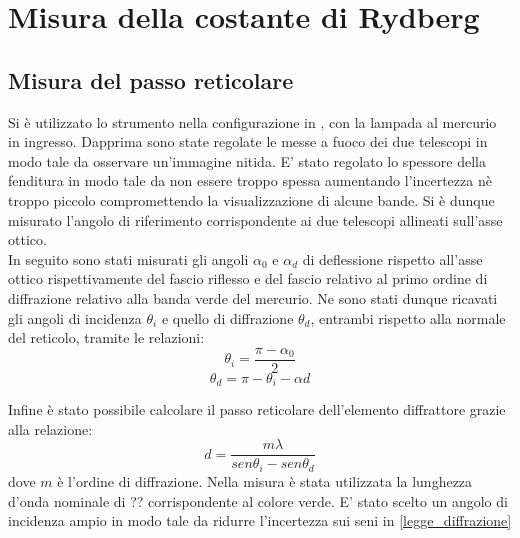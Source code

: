 \section{Misura della costante di Rydberg}

\subsection{Misura del passo reticolare}
Si è utilizzato lo strumento nella configurazione in , con la lampada al mercurio in ingresso. Dapprima sono state regolate le messe a fuoco dei due telescopi in modo tale da osservare un'immagine nitida. E' stato regolato lo spessore della fenditura in modo tale da non essere troppo spessa aumentando l'incertezza nè troppo piccolo compromettendo la visualizzazione di alcune bande. Si è dunque misurato l'angolo di riferimento corrispondente ai due telescopi allineati sull'asse ottico.\\
 In seguito sono stati misurati gli angoli $\alpha_{0}$ e $\alpha_{d}$ di deflessione rispetto all'asse ottico rispettivamente del fascio riflesso e del fascio relativo al primo ordine di diffrazione relativo alla banda verde del mercurio. Ne sono stati dunque ricavati gli angoli di incidenza $\theta_{i}$ e quello di diffrazione $\theta_{d}$, entrambi rispetto alla normale del reticolo, tramite le relazioni:
 \begin{equation}
 \theta_{i}=\frac{\pi-\alpha_{0}}{2}
 \end{equation}
 \begin{equation}
  \theta_{d}=\pi-\theta_{i}-\alpha{d}
 \end{equation}
 
 Infine è stato possibile calcolare il passo reticolare dell'elemento diffrattore grazie alla relazione:
\begin{equation}
d = \frac{m\lambda}{sen\theta_{i} - sen\theta_{d}}
\label{legge_diffrazione}
\end{equation} 
dove $m$ è l'ordine di diffrazione. Nella misura è stata utilizzata la lunghezza d'onda nominale di ?? corrispondente al colore verde. E' stato scelto un angolo di incidenza ampio in modo tale da ridurre l'incertezza sui seni in \ref{legge_diffrazione} \\

